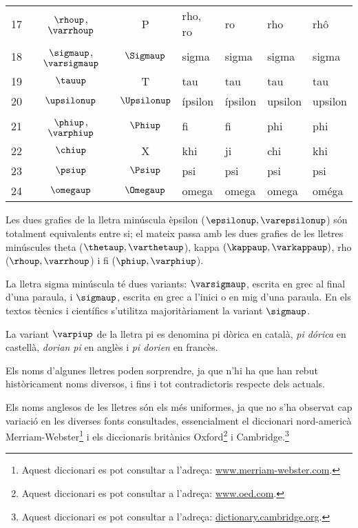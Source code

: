 \begin{center}
\begin{tabular}{cccllll}
   17 & $\rhoup$, $\varrhoup$ & P & rho, ro & ro &  rho & rhô\\
   18 & $\sigmaup$, $\varsigmaup$ & $\Sigmaup$ & sigma & sigma &  sigma &sigma\\
   19 & $\tauup$ & T & tau & tau & tau &tau\\
   20 & $\upsilonup$ & $\Upsilonup$ & ípsilon & ípsilon &  upsilon &upsilon\\
   21 & $\phiup$, $\varphiup$ & $\Phiup$ & fi & fi &  phi & phi\\
   22 & $\chiup$ & X & khi & ji &  chi & khi\\
   23 & $\psiup$ & $\Psiup$ & psi & psi &  psi & psi\\
   24 & $\omegaup$ & $\Omegaup$ & omega & omega &  omega & oméga\\
   \bottomrule[1pt]
   \end{tabular}
\end{center}
\pagebreak


Les dues grafies de la lletra minúscula èpsilon  ($\epsilonup,
\varepsilonup$) són totalment equivalents entre si; el mateix passa
amb les dues grafies de les lletres minúscules theta ($\thetaup,
\varthetaup$), kappa $(\kappaup, \varkappaup)$, rho ($\rhoup,\varrhoup$) i fi ($\phiup, \varphiup$).

La lletra sigma minúscula té dues variants: $\varsigmaup$, escrita en
grec al final d'una paraula, i $\sigmaup$, escrita en grec a l'inici o
en mig d'una paraula. En els textos tècnics i científics s'utilitza
majoritàriament la variant $\sigmaup$.

La variant $\varpiup$ de la lletra pi es denomina pi dòrica en
català, \textit{pi dórica} en castellà, \textit{dorian pi} en anglès i \textit{pi dorien} en francès.

Els noms d'algunes lletres poden sorprendre, ja que n'hi ha que han rebut històricament noms
diversos, i fins i tot contradictoris respecte dels actuals.

Els noms anglesos de les lletres són els més uniformes, ja que no
s'ha observat cap variació en les diverses fonts consultades, essencialment el diccionari nord-americà Merriam-Webster\footnote{Aquest diccionari es pot consultar a l'adreça: \href{https://www.merriam-webster.com/}{www.merriam-webster.com}.} i els diccionaris britànics Oxford\footnote{Aquest diccionari es pot consultar a l'adreça: \href{http://www.oed.com/}{www.oed.com}.} i Cambridge.\footnote{Aquest diccionari es pot consultar a l'adreça: \href{http://dictionary.cambridge.org/}{dictionary.cambridge.org}.}

